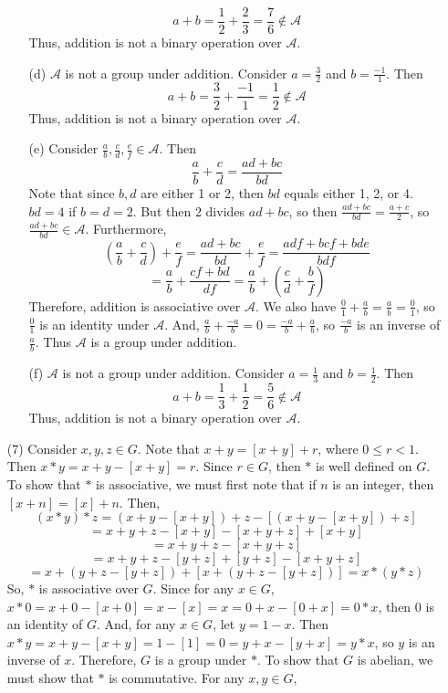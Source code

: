 \documentclass[12pt]{article}
\begin{document}
\begin{itemize}
\begin{itemize}
$$a + b = \frac{1}{2} + \frac{2}{3} = \frac{7}{6} \not \in \mathcal{A}$$
Thus, addition is not a binary operation over $\mathcal{A}$.
\item[(d)]
$\mathcal{A}$ is not a group under addition. Consider $a = \frac{3}{2}$ and $b = \frac{-1}{1}$. Then
$$a + b = \frac{3}{2} + \frac{-1}{1} = \frac{1}{2} \not \in \mathcal{A}$$
Thus, addition is not a binary operation over $\mathcal{A}$.
\item[(e)]
Consider $\frac{a}{b}, \frac{c}{d}, \frac{e}{f} \in \mathcal{A}$. Then
$$\frac{a}{b} + \frac{c}{d} = \frac{ad + bc}{bd}$$
Note that since $b, d$ are either 1 or 2, then $bd$ equals either 1, 2, or 4. $bd = 4$ if $b = d = 2$. But then 2 divides $ad + bc$, so then $\frac{ad + bc}{bd} = \frac{a + c}{2}$, so $\frac{ad + bc}{bd} \in \mathcal{A}$. Furthermore, 
$$\left(\frac{a}{b} + \frac{c}{d} \right) + \frac{e}{f} = \frac{ad + bc}{bd} + \frac{e}{f} = \frac{adf + bcf + bde}{bdf}$$
$$ = \frac{a}{b} + \frac{cf + bd}{df} = \frac{a}{b} + \left(\frac{c}{d} + \frac{b}{f}\right)$$
Therefore, addition is associative over $\mathcal{A}$. We also have $\frac{0}{1} + \frac{a}{b} = \frac{a}{b} = \frac{0}{1}$, so $\frac{0}{1}$ is an identity under $\mathcal{A}$. And, $\frac{a}{b} + \frac{-a}{b} = 0 = \frac{-a}{b} + \frac{a}{b}$, so $\frac{-a}{b}$ is an inverse of $\frac{a}{b}$. Thus $\mathcal{A}$ is a group under addition.
\item[(f)]
$\mathcal{A}$ is not a group under addition. Consider $a = \frac{1}{3}$ and $b = \frac{1}{2}$. Then
$$a + b = \frac{1}{3} + \frac{1}{2} = \frac{5}{6} \not \in \mathcal{A}$$
Thus, addition is not a binary operation over $\mathcal{A}$.
\end{itemize}
\item[(7)]
Consider $x, y, z \in G$. Note that $x + y = [x + y] + r$, where $0 \leq r < 1$. Then $x * y = x + y - [x + y] = r$. Since $r \in G$, then $*$ is well defined on $G$. To show that $*$ is associative, we must first note that if $n$ is an integer, then $[x + n] = [x] + n$. Then,
$$(x * y) * z = (x + y - [x + y]) + z - [(x + y - [x + y]) + z]$$
$$= x + y + z - [x + y] - [x + y + z] + [x + y]$$
$$= x + y + z - [x + y + z]$$
$$= x + y + z - [y + z] + [y + z] - [x + y + z]$$
$$= x + (y + z - [y + z]) + [x + (y + z - [y + z])] = x * (y * z)$$
So, $*$ is associative over $G$. Since for any $x \in G$, $x * 0 = x + 0 - [x + 0] = x - [x] = x = 0 + x - [0 + x] = 0 * x$, then $0$ is an identity of $G$. And, for any $x \in G$, let $y = 1 - x$. Then $x * y = x + y - [x + y] = 1 - [1] = 0 = y + x - [y + x] = y * x$, so $y$ is an inverse of $x$. Therefore, $G$ is a group under $*$. To show that $G$ is abelian, we must show that $*$ is commutative. For any $x, y \in G$,

\end{itemize}
\end{document}

